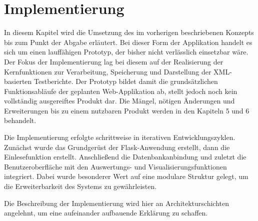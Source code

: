 \newpage
\section{Implementierung}
\label{sec:implementierung}


In diesem Kapitel wird die Umsetzung des im vorherigen beschriebenen Konzepts bis zum Punkt der Abgabe erläutert.
Bei dieser Form der Applikation handelt es sich um einen lauffähigen Prototyp, der bisher nicht verlässlich einsetzbar wäre.
Der Fokus der Implementierung lag bei diesem auf der Realisierung der Kernfunktionen zur Verarbeitung, Speicherung und Darstellung der XML-basierten Testberichte.
Der Prototyp bildet damit die grundsätzlichen Funktionsabläufe der geplanten Web-Applikation ab, stellt jedoch noch kein vollständig ausgereiftes Produkt dar.
Die Mängel, nötigen Änderungen und Erweiterungen bis zu einem nutzbaren Produkt werden in den Kapiteln 5 und 6 behandelt.

Die Implementierung erfolgte schrittweise in iterativen Entwicklungszyklen.
Zunächst wurde das Grundgerüst der Flask-Anwendung erstellt, dann die Einlesefunktion erstellt.
Anschließend die Datenbankanbindung und zuletzt die Benutzeroberfläche mit den Auswertungs- und Visualisierungsfunktionen integriert.
Dabei wurde besonderer Wert auf eine modulare Struktur gelegt, um die Erweiterbarkeit des Systems zu gewährleisten.

Die Beschreibung der Implementierung wird hier an Architekturschichten angelehnt, um eine aufeinander aufbauende Erklärung zu schaffen.







